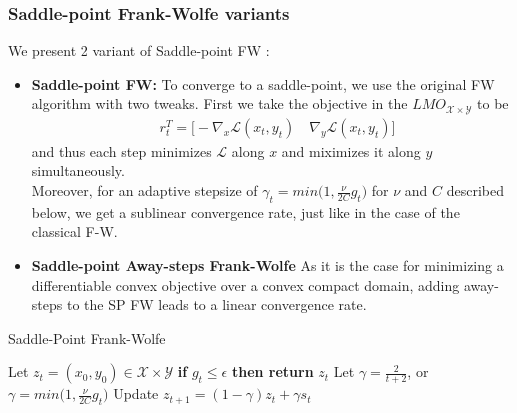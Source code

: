 \documentclass{article}
\begin{document}
\subsubsection{Saddle-point Frank-Wolfe variants}
We present 2 variant of Saddle-point FW \cite{Gideletal16}:
\begin{itemize}
    \item \textbf{Saddle-point FW:} To converge to a saddle-point, we use the original FW algorithm with two tweaks. First we take the objective in the $LMO_{\mathcal{X}\times\mathcal{Y}}$ to be
    \begin{equation*}
    \begin{aligned}
        &r_{t}^{T}=\Big[-\nabla_{x} \mathcal{L}(x_{t},y_{t})\quad \nabla_{y} \mathcal{L}(x_{t},y_{t})\Big]
    \end{aligned}
    \end{equation*}  
    and thus each step minimizes $\mathcal{L}$ along $x$ and miximizes it along $y$ simultaneously.\\
    Moreover, for an adaptive stepsize of $\gamma_{t}= \textit{min}\Big(1,\frac{\nu}{2C}g_{t}\Big)$ for $\nu$ and $C$ described below, we get a sublinear convergence rate, just like in the case of the classical F-W.
    \item \textbf{Saddle-point Away-steps Frank-Wolfe} As it is the case for minimizing a differentiable convex objective over a convex compact domain, adding away-steps to the SP FW leads to a linear convergence rate.
\end{itemize}
\begin{algorithm}[tb]
   \caption{Saddle-Point Frank-Wolfe}
   \label{alg:example}
\begin{algorithmic}
   \STATE Let $z_{t}=(x_{0},y_{0})\in\mathcal{X}\times\mathcal{Y}$
   \STATE \textbf{if } $g_{t}\leq\epsilon$ \textbf{ then return } $z_{t}$
   \STATE Let $\gamma = \frac{2}{t+2}$, or $\gamma=\textit{min}\Big(1,\frac{\nu}{2C}g_{t}\Big)$
   \STATE Update $z_{t+1}= (1-\gamma)z_{t}+ \gamma s_{t}$
   \ENDFOR
\end{algorithmic}
\end{algorithm}
\end{document}

